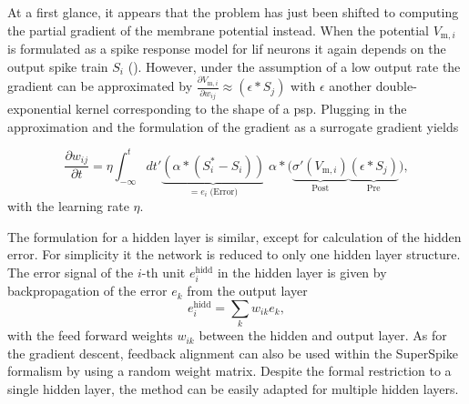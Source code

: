 At a first glance, it appears that the problem has just been shifted to computing the partial gradient of the membrane potential instead. When the potential $V_{\text{m},i}$ is formulated as a spike response model for \gls{lif} neurons it again depends on the output spike train $S_i$ (\citealp{gerstner2014dynamics}). However, under the assumption of a low output rate the gradient can be approximated by $\frac{\partial V_{\text{m},i}}{\partial w_{ij}} \approx (\epsilon \ast S_j)$ with $\epsilon$ another double-exponential kernel corresponding to the shape of a \gls{psp}. Plugging in the approximation and the formulation of the gradient as a surrogate gradient yields

\begin{equation}
\frac{\partial w_{ij}}{\partial t} = \eta \int_{-\infty}^{t} dt'
\underbrace{\left(\alpha \ast (S^*_i - S_i)\right)}_{= e_i \; \text{(Error)}} 
\; \alpha \ast 
\Big(\underbrace{\sigma'(V_{\text{m},i})}_{\text{Post}} 
\underbrace{\left(\epsilon \ast S_j\right)}_{\text{Pre}}\Big),
\label{superspikeweightupdateeq}
\end{equation}
with the learning rate $\eta$. 

The formulation for a hidden layer is similar, except for calculation of the hidden error. For simplicity it the network is reduced to only one hidden layer structure. The error signal of the $i \text{-th}$ unit $e^\text{hidd}_i$ in the hidden layer is given by backpropagation of the error $e_k$ from the output layer
\begin{equation*}
e^\text{hidd}_i = \sum_{k} w_{ik} e_k,
\end{equation*}
with the feed forward weights $w_{ik}$ between the hidden and output layer. As for the gradient descent, feedback alignment can also be used within the SuperSpike formalism by using a random weight matrix. Despite the formal restriction to a single hidden layer, the method can be easily adapted for multiple hidden layers.


